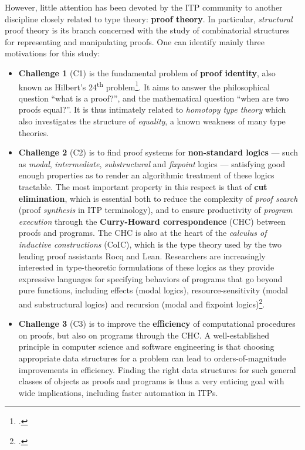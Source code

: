 \documentclass[12pt,draftproposal]{msca-pf}
\begin{document}
However, little attention has been devoted by the ITP community to another discipline closely
related to type theory: \textbf{proof theory}. In particular, \emph{structural} proof theory is its
branch concerned with the study of combinatorial structures for representing and manipulating
proofs. One can identify mainly three motivations for this study:
\begin{itemize}
    \item \textbf{Challenge 1} (C1) is the fundamental problem of \textbf{proof identity}, also
    known as Hilbert's 24\textsuperscript{th} problem\footcite{strasburger-problem-2019}. It aims to
    answer the philosophical question ``what is a proof?'', and the mathematical question ``when are
    two proofs equal?''. It is thus intimately related to \emph{homotopy type theory} which also
    investigates the structure of \emph{equality}, a known weakness of many type theories.

    \item \textbf{Challenge 2} (C2) is to find proof systems for \textbf{non-standard logics} ---
    such as \emph{modal}, \emph{intermediate}, \emph{substructural} and \emph{fixpoint} logics ---
    satisfying good enough properties as to render an algorithmic treatment of these logics
    tractable. The most important property in this respect is that of \textbf{cut elimination},
    which is essential both to reduce the complexity of \emph{proof search} (proof \emph{synthesis}
    in ITP terminology), and to ensure productivity of \emph{program execution} through the
    \textbf{Curry-Howard correspondence} (CHC) between proofs and programs. The CHC is also at the
    heart of the \emph{calculus of inductive constructions} (CoIC), which is the type theory used by
    the two leading proof assistants Rocq and Lean. Researchers are increasingly interested in
    type-theoretic formulations of these logics as they provide expressive languages for specifying
    behaviors of programs that go beyond pure functions, including effects (modal logics),
    resource-sensitivity (modal and substructural logics) and recursion (modal and fixpoint
    logics)\footcite{tangModalEffectTypes2025,marshallLinearityUniquenessEntente2022,cloustonGuardedLambdaCalculusProgramming2017}.
    
    \item \textbf{Challenge 3} (C3) is to improve the \textbf{efficiency} of computational
    procedures on proofs, but also on programs through the CHC. A well-established principle in
    computer science and software engineering is that choosing appropriate data structures for a
    problem can lead to orders-of-magnitude improvements in efficiency. Finding the right data
    structures for such general classes of objects as proofs and programs is thus a very enticing
    goal with wide implications, including faster automation in ITPs.
\end{itemize}
\end{document}
